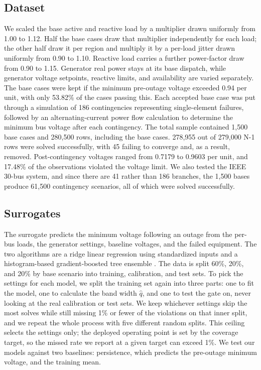\documentclass[conference]{IEEEtran}
\begin{document}
\subsection{Dataset}
We scaled the base active and reactive load by a multiplier drawn uniformly from 1.00 to 1.12. Half the base cases draw that multiplier independently for each load; the other half draw it per region and multiply it by a per-load jitter drawn uniformly from 0.90 to 1.10. Reactive load carries a further power-factor draw from 0.90 to 1.15. Generator real power stays at its base dispatch, while generator voltage setpoints, reactive limits, and availability are varied separately. The base cases were kept if the minimum pre-outage voltage exceeded 0.94 per unit, with only 53.82\% of the cases passing this. Each accepted base case was put through a simulation of 186 contingencies representing single-element failures, followed by an alternating-current power flow calculation to determine the minimum bus voltage after each contingency. The total sample contained 1{,}500 base cases and 280{,}500 rows, including the base cases. 278{,}955 out of 279{,}000 N-1 rows were solved successfully, with 45 failing to converge and, as a result, removed. Post-contingency voltages ranged from 0.7179 to 0.9603 per unit, and 17.48\% of the observations violated the voltage limit. We also tested the IEEE 30-bus system, and since there are 41 rather than 186 branches, the 1{,}500 bases produce 61{,}500 contingency scenarios, all of which were solved successfully.

\subsection{Surrogates}
The surrogate predicts the minimum voltage following an outage from the per-bus loads, the generator settings, baseline voltages, and the failed equipment. The two algorithms are a ridge linear regression using standardized inputs and a histogram-based gradient-boosted tree ensemble \cite{sklearn}. The data is split 60\%, 20\%, and 20\% by base scenario into training, calibration, and test sets. To pick the settings for each model, we split the training set again into three parts: one to fit the model, one to calculate the band width $\hat{q}$, and one to test the gate on, never looking at the real calibration or test sets. We keep whichever settings skip the most solves while still missing 1\% or fewer of the violations on that inner split, and we repeat the whole process with five different random splits. This ceiling selects the settings only; the deployed operating point is set by the coverage target, so the missed rate we report at a given target can exceed 1\%. We test our models against two baselines: persistence, which predicts the pre-outage minimum voltage, and the training mean.
\end{document}
